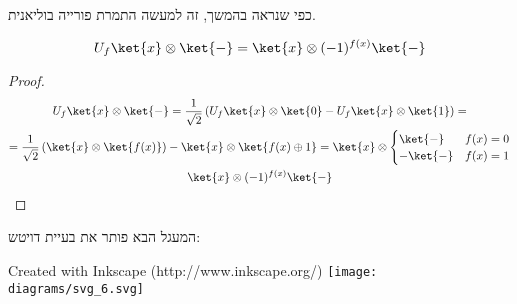 \documentclass{tstextbook}
\begin{document}
\begin{remark}
כפי שנראה בהמשך, זה למעשה התמרת פורייה בוליאנית.

\end{remark}
\begin{lemma}
$$U_{f}\ket{x} \otimes \ket{-} =\ket{x} \otimes (-1)^{f(x)}\ket{-} $$

\end{lemma}
\begin{proof}
$$\begin{gather}U_{f}\ket{x} \otimes \ket{-} =\frac{1}{\sqrt{ 2 }}\left( U_{f}\ket{x} \otimes \ket{0} -U_{f }\ket{x} \otimes \ket{1}  \right)= \\=\frac{1}{\sqrt{ 2 }}\left( \ket{x} \otimes \ket{f(x)}  \right)-\ket{x } \otimes \ket{f(x)\oplus 1} =\ket{x} \otimes \begin{cases}\ket{-}  & f(x)=0 \\-\ket{-} & f(x)=1 \end{cases}  \\\ket{x} \otimes (-1)^{f(x)}\ket{-} 
\end{gather}$$

\end{proof}
\begin{proposition}
המעגל הבא פותר את בעיית דויטש:

 Created with Inkscape (http://www.inkscape.org/) \texttt{[image: diagrams/svg\_6.svg]}
\end{proposition}
\end{document}
